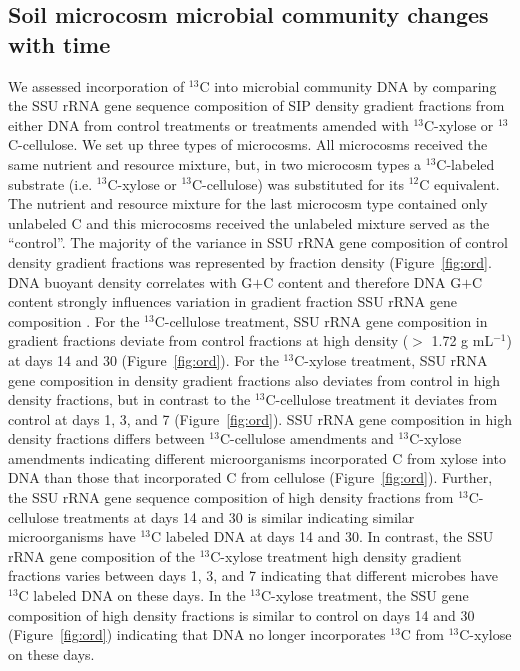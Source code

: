 \subsection{Soil microcosm microbial community changes with time}
We assessed incorporation of $^{13}$C into microbial community DNA by comparing the
SSU rRNA gene sequence composition of SIP density gradient fractions from
either DNA from control treatments or treatments amended with $^{13}$C-xylose
or $^{13}$C-cellulose. We set up three types of microcosms. All microcosms
received the same nutrient and resource mixture, but, in two microcosm types
a $^{13}$C-labeled substrate (i.e. $^{13}$C-xylose or $^{13}$C-cellulose) was
substituted for its $^{12}$C equivalent. The nutrient and resource mixture for
the last microcosm type contained only unlabeled C and this microcosms received
the unlabeled mixture served as the ``control''. The majority of
the variance in SSU rRNA gene composition of control density gradient fractions
was represented by fraction density (Figure~\ref{fig:ord}. DNA buoyant density
correlates with G$+$C content \citep{Buckley_2007} and therefore DNA G$+$C
content strongly influences variation in gradient fraction SSU rRNA gene
composition . For the $^{13}$C-cellulose treatment, SSU rRNA gene composition
in gradient fractions deviate from control fractions at high density ($>$ 1.72
g mL$^{-1}$) at days 14 and 30 (Figure~\ref{fig:ord}). For the $^{13}$C-xylose
treatment, SSU rRNA gene composition in density gradient fractions also
deviates from control in high density fractions, but in contrast to the
$^{13}$C-cellulose treatment it deviates from control at days 1, 3, and
7 (Figure~\ref{fig:ord}). SSU rRNA gene composition in high density fractions
differs between $^{13}$C-cellulose amendments and $^{13}$C-xylose amendments
indicating different microorganisms incorporated C from xylose into DNA than
those that incorporated C from cellulose (Figure~\ref{fig:ord}). Further, the
SSU rRNA gene sequence composition of high density fractions from
$^{13}$C-cellulose treatments at days 14 and 30 is similar indicating similar
microorganisms have $^{13}$C labeled DNA at days 14 and 30. In contrast, the
SSU rRNA gene composition of the $^{13}$C-xylose treatment high density
gradient fractions varies between days 1, 3, and 7 indicating that different
microbes have $^{13}$C labeled DNA on these days. In the $^{13}$C-xylose
treatment, the SSU gene composition of high density fractions is similar to
control on days 14 and 30 (Figure~\ref{fig:ord}) indicating that DNA no longer
incorporates $^{13}$C from $^{13}$C-xylose on these days. 

